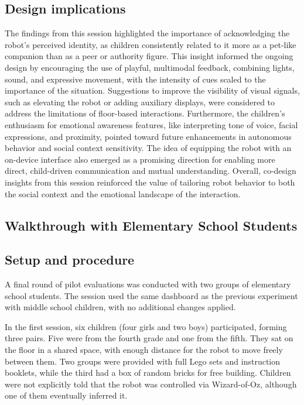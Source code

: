 \documentclass[a4paper]{usiinfbachelorproject}
\begin{document}
\subsection*{\textbf{Design implications}}
The findings from this session highlighted the importance of acknowledging the robot's perceived identity, as children consistently related to it more as a pet-like companion than as a peer or authority figure.
This insight informed the ongoing design by encouraging the use of playful, multimodal feedback, combining lights, sound, and expressive movement, with the intensity of cues scaled to the importance of the situation.
Suggestions to improve the visibility of visual signals, such as elevating the robot or adding auxiliary displays, were considered to address the limitations of floor-based interactions.
Furthermore, the children's enthusiasm for emotional awareness features, like interpreting tone of voice, facial expressions, and proximity, pointed toward future enhancements in autonomous behavior and social context sensitivity.
The idea of equipping the robot with an on-device interface also emerged as a promising direction for enabling more direct, child-driven communication and mutual understanding.
Overall, co-design insights from this session reinforced the value of tailoring robot behavior to both the social context and the emotional landscape of the interaction.

\subsection{\textbf{Walkthrough with Elementary School Students}}\label{sec:elementary-school-walkthrough}
\subsection*{\textbf{Setup and procedure}}
A final round of pilot evaluations was conducted with two groups of elementary school students.
The session used the same dashboard as the previous experiment with middle school children, with no additional changes applied.

In the first session, six children (four girls and two boys) participated, forming three pairs.
Five were from the fourth grade and one from the fifth.
They sat on the floor in a shared space, with enough distance for the robot to move freely between them.
Two groups were provided with full Lego sets and instruction booklets, while the third had a box of random bricks for free building.
Children were not explicitly told that the robot was controlled via Wizard-of-Oz, although one of them eventually inferred it.
\end{document}
